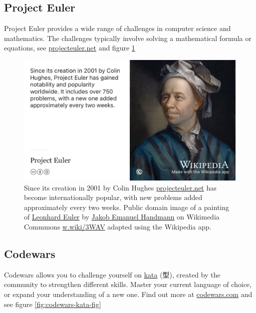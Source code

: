 \documentclass[
]{book}
\begin{document}
\hypertarget{euler}{%
\subsection{Project Euler}\label{euler}}

Project Euler provides a wide range of challenges in computer science and mathematics. The challenges typically involve solving a mathematical formula or equations, see \href{https://projecteuler.net/}{projecteuler.net} and figure \ref{fig:euler-fig}

\begin{figure}

{\centering \includegraphics[width=0.99\linewidth]{images/project-euler} 

}

\caption{Since its creation in 2001 by Colin Hughes \href{https://projecteuler.net/}{projecteuler.net} has become internationally popular, with new problems added approximately every two weeks. \citep{colinhughes} Public domain image of a painting of \href{https://en.wikipedia.org/wiki/Leonhard_Euler}{Leonhard Euler} by \href{https://en.wikipedia.org/wiki/Jakob_Emanuel_Handmann}{Jakob Emanuel Handmann} on Wikimedia Commmons \href{https://w.wiki/3WAV}{w.wiki/3WAV} adapted using the Wikipedia app.}\label{fig:euler-fig}
\end{figure}



\hypertarget{codewars}{%
\subsection{Codewars}\label{codewars}}

Codewars allows you to challenge yourself on \href{https://en.wikipedia.org/wiki/Kata}{kata} (型), created by the community to strengthen different skills. Master your current language of choice, or expand your understanding of a new one. Find out more at \href{https://www.codewars.com}{codewars.com} and see figure \ref{fig:codewars-kata-fig}
\end{document}
